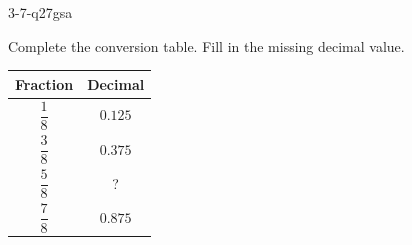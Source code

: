 \begin{practiceQuestion}{3-7-q27}{gsa}
\begin{questionText}
Complete the conversion table. Fill in the missing decimal value.

\begin{center}
\begin{tabular}{|c|c|}
\hline
\textbf{Fraction} & \textbf{Decimal} \\
\hline
$\dfrac{1}{8}$ & $0.125$ \\ \hline
$\dfrac{3}{8}$ & $0.375$ \\ \hline
$\dfrac{5}{8}$ & ? \\ \hline
$\dfrac{7}{8}$ & $0.875$ \\ \hline
\end{tabular}
\end{center}
\end{questionText}
\end{practiceQuestion}

